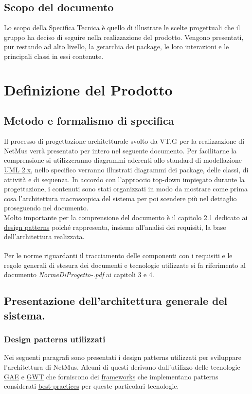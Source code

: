 \section{Scopo del documento}
Lo scopo della Specifica Tecnica \`e quello di illustrare le scelte progettuali
che il gruppo ha deciso di seguire nella realizzazione del prodotto. Vengono
presentati, pur restando ad alto livello, la gerarchia dei package, le loro
interazioni e le principali classi in essi contenute.



\chapter{Definizione del Prodotto}
\thispagestyle{fancy}
\section{Metodo e formalismo di specifica}
Il processo di progettazione architetturale svolto da VT.G per la
realizzazione di NetMus verr\`a presentato per intero nel seguente documento. Per
facilitarne la comprensione si utilizzeranno diagrammi aderenti allo
standard di modellazione \underline{UML 2.x}, nello specifico verranno
illustrati diagrammi dei package, delle classi, di attivit\`a e di sequenza.
In accordo con l'approccio top-down impiegato durante la progettazione, i
contenuti sono stati organizzati in modo da mostrare come prima cosa
l'architettura macroscopica del sistema per poi scendere pi\`u nel dettaglio
proseguendo nel documento.\\
Molto importante per la comprensione del documento \`e il capitolo 2.1 dedicato
ai \underline{design patterns} poich\'e rappresenta, insieme all'analisi dei requisiti, la
base dell'architettura realizzata.
\\\\
Per le norme riguardanti il tracciamento delle componenti con i requisiti e le
regole generali di stesura dei documenti e tecnologie utilizzate si fa
riferimento al documento \emph{NormeDiProgetto-\versionenormeprogetto.pdf} ai
capitoli 3 e 4.

\section{Presentazione dell'architettura generale del sistema.}

\subsection{Design patterns utilizzati}
Nei seguenti paragrafi sono presentati i design patterns utilizzati per
sviluppare l'architettura di NetMus. Alcuni di questi derivano dall'utilizzo
delle tecnologie \underline{GAE} e \underline{GWT} che forniscono dei
\underline{frameworks} che implementano patterns considerati \underline{best-practices} per queste particolari
tecnologie.

